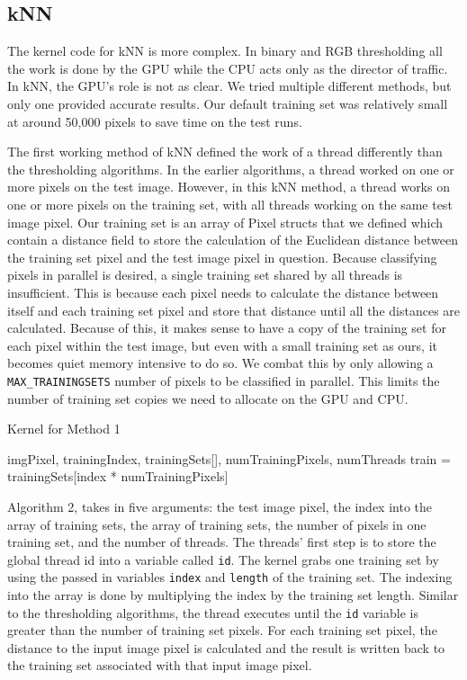 \documentclass[conference]{IEEEtran}
\begin{document}
\subsection{kNN}

The kernel code for kNN is more complex. In binary and RGB thresholding all the work is done by the GPU while the CPU acts only as the director of traffic. In kNN, the GPU’s role is not as clear. We tried multiple different methods, but only one provided accurate results. Our default training set was relatively small at around 50,000 pixels to save time on the test runs.

The first working method of kNN defined the work of a thread differently than the thresholding algorithms. In the earlier algorithms, a thread worked on one or more pixels on the test image. However, in this kNN method, a thread works on one or more pixels on the training set, with all threads working on the same test image pixel. Our training set is an array of Pixel structs that we defined which contain a distance field to store the calculation of the Euclidean distance between the training set pixel and the test image pixel in question. Because classifying pixels in parallel is desired, a single training set shared by all threads is insufficient. This is because each pixel needs to calculate the distance between itself and each training set pixel and store that distance until all the distances are calculated. Because of this, it makes sense to have a copy of the training set for each pixel within the test image, but even with a small training set as ours, it becomes quiet memory intensive to do so. We combat this by only allowing a \verb|MAX_TRAININGSETS| number of pixels to be classified in parallel. This limits the number of training set copies we need to allocate on the GPU and CPU.
\begin{algorithm}[H]
\caption{Kernel for Method 1}
\begin{algorithmic}[1]
\renewcommand{\algorithmicrequire}{\textbf{Input:}} 
\REQUIRE imgPixel, trainingIndex, trainingSets[], numTrainingPixels, numThreads
\STATE train = trainingSets[index * numTrainingPixels]
\ENDFOR
\end{algorithmic}
\end{algorithm}

Algorithm 2, takes in five arguments: the test image pixel, the index into the array of training sets, the array of training sets, the number of pixels in one training set, and the number of threads. The threads' first step is to store the global thread id into a variable called \verb|id|. The kernel grabs one training set by using the passed in variables \verb|index| and \verb|length| of the training set. The indexing into the array is done by multiplying the index by the training set length. Similar to the thresholding algorithms, the thread executes until the \verb|id| variable is greater than the number of training set pixels. For each training set pixel, the distance to the input image pixel is calculated and the result is written back to the training set associated with that input image pixel.
\end{document}
